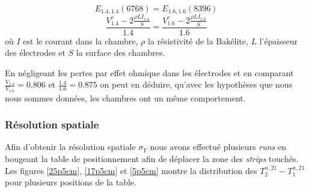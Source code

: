 \begin{equation}
E_{\num{1.4},\num{1.4}}\left( 6768 \right)=E_{\num{1.6},\num{1.6}}\left( 8396 \right)
\end{equation} 
\begin{equation}
\frac{V^c_{1.4}-2\frac{\rho L I_{1.4}}{S} }{1.4}=\frac{V^c_{1.6}-2\frac{\rho L I_{1.6}}{S} }{1.6}
\end{equation} 
où $I$ est le courant dans la chambre, $\rho$ la résistivité de la Bakélite, $L$ l'épaisseur des électrodes et $S$ la surface des chambres.

En négligeant les pertes par effet ohmique dans les électrodes et en comparant $\frac{V_{1.4}}{V_{1.6}}=\num{0.806}$ et $\frac{1.4}{1.6}=\num{0.875}$ on peut en déduire, qu'avec les hypothèses que nous nous sommes données, les chambres ont un même comportement.

\subsubsection{Résolution spatiale}

Afin d'obtenir la résolution spatiale $\sigma_{Y}$ nous avons effectué plusieurs \textit{runs} en bougeant la table de positionnement afin de déplacer la zone des \textit{strips} touchés. Les figures \ref{25p5cm}, \ref{17p5cm} et \ref{5p5cm} montre la distribution des $T^{n,21}_2-T^{n,21}_1$ pour plusieurs positions de la table. 

